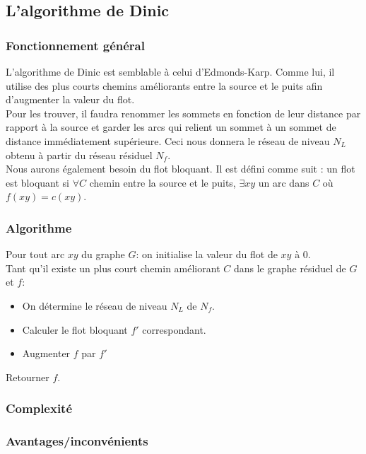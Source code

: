 \documentclass[a4paper]{article}
\begin{document}
\subsection{L'algorithme de Dinic}

\subsubsection{Fonctionnement général}
L'algorithme de Dinic est semblable à celui d'Edmonds-Karp. Comme lui, il utilise des plus courts chemins améliorants entre la source et le puits afin d'augmenter la valeur du flot. \\Pour les trouver, il faudra renommer les sommets en fonction de leur distance par rapport à la source et garder les arcs qui relient un sommet à un sommet de distance immédiatement supérieure. Ceci nous donnera le réseau de niveau $N_L$ obtenu à partir du réseau résiduel $N_f$.\\
Nous aurons également besoin du flot bloquant. Il est défini comme suit : un flot est bloquant si $\forall C$ chemin entre la source et le puits, $\exists xy$ un arc dans $C$ où $f(xy)=c(xy)$.\\

\subsubsection{Algorithme}
Pour tout arc $xy$ du graphe $G$: on initialise la valeur du flot de $xy$ à $0$.\\
Tant qu'il existe un plus court chemin améliorant $C$ dans le graphe résiduel de $G$ et $f$:
\begin{itemize}
    \item 
	On détermine le réseau de niveau $N_L$ de $N_f$.
    \item
    Calculer le flot bloquant $f'$ correspondant.
    \item 
    Augmenter $f$ par $f'$
\end{itemize}
Retourner $f$.\\

\subsubsection{Complexité}

\subsubsection{Avantages/inconvénients}
\end{document}
